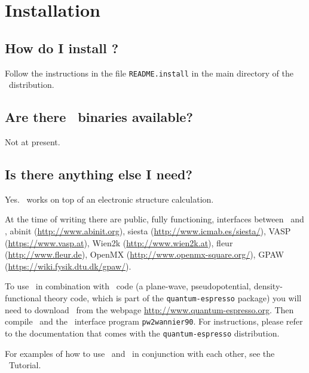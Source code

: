 \section{Installation}

\subsection{How do I install \wannier?\label{sec:installation}}

Follow the instructions in the file {\tt README.install} in the main
directory of the \wannier\ distribution.

\subsection{Are there \wannier\ binaries available?}

Not at present.

\subsection{Is there anything else I need?}

Yes. \wannier\ works on top of an electronic structure
calculation. 

At the time of writing there are public, fully functioning, interfaces
between \wannier\ and \pwscf, {\sc abinit}
(\url{http://www.abinit.org}), {\sc siesta}
(\url{http://www.icmab.es/siesta/}), {\sc VASP}
(\url{https://www.vasp.at}), {\sc Wien2k} (\url{http://www.wien2k.at}),
{\sc fleur} (\url{http://www.fleur.de}), {\sc OpenMX} (\url{http://www.openmx-square.org/}), 
{\sc GPAW} (\url{https://wiki.fysik.dtu.dk/gpaw/}).

To use 
\wannier\ in combination with 
\pwscf\ code (a plane-wave, pseudopotential, density-functional theory
code, which is part of the {\tt quantum-espresso} package) you 
will need to download \pwscf\ from the webpage \url{http://www.quantum-espresso.org}. Then compile \pwscf\
and the \wannier\ interface program {\tt pw2wannier90}. For
instructions, please refer to the
documentation that comes with the {\tt quantum-espresso} distribution.

For examples of how to use \pwscf\ and \wannier\ in conjunction with
each other, see the \wannier\ Tutorial.






